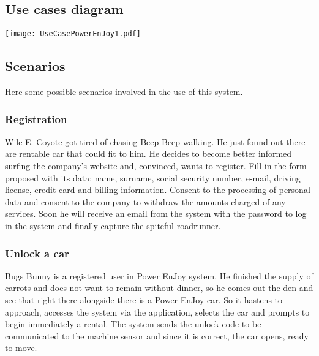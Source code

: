 \documentclass{scrreprt}
\begin{document}
\subsection{Use cases diagram}

\begin{center}
\label{fig:usecases}
\texttt{[image: UseCasePowerEnJoy1.pdf]}
\end{center}

\begin{comment}
Use cases table example:
\begin{table}
\begin{tabularx}{\columnwidth}{>{\bfseries}lX}
\toprule
Use case & \\
\midrule
Actors & \\
\midrule
Entry conditions & \\
\midrule
Flow of events & \\
\midrule
Exit conditions & \\
\midrule
Exceptions & \\
\bottomrule
\end{tabularx}
\end{table}
\end{comment}

\subsection{Scenarios}
Here some possible scenarios involved in the use of this system.

\subsubsection{Registration}
Wile E. Coyote got tired of chasing Beep Beep walking. He just found out there are rentable car that could fit to him. He decides to become better informed surfing the company's website and, convinced, wants to register.
Fill in the form proposed with its data: name, surname, social security number, e-mail, driving license, credit card and billing information. Consent to the processing of personal data and consent to the company to withdraw the amounts charged of any services.
Soon he will receive an email from the system with the password to log in the system and finally capture the spiteful roadrunner.

\subsubsection{Unlock a car}
Bugs Bunny is a registered user in Power EnJoy system. He finished the supply of carrots and does not want to remain without dinner, so he comes out the den and see that right there alongside there is a Power EnJoy car. So it hastens to approach, accesses the system via the application, selects the car and prompts to begin immediately a rental. The system sends the unlock code to be communicated to the machine sensor and since it is correct, the car opens, ready to move.
\end{document}

